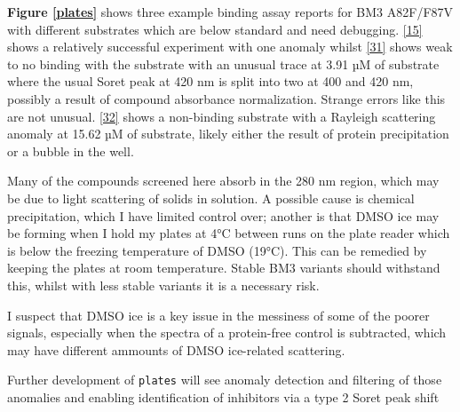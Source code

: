 \documentclass{article}
\begin{document}
\par
\textbf{Figure \ref{plates}} shows three example binding assay reports for BM3 A82F/F87V with different substrates which are below standard and need debugging. \ref{15} shows a relatively successful experiment with one anomaly whilst \ref{31} shows weak to no binding with the substrate with an unusual trace at 3.91 µM of substrate where the usual Soret peak at 420 nm is split into two at 400 and 420 nm, possibly a result of compound absorbance normalization. Strange errors like this are not unusual. \ref{32} shows a non-binding substrate with a Rayleigh scattering anomaly at 15.62 µM of substrate, likely either the result of protein precipitation or a bubble in the well. %
\par
Many of the compounds screened here absorb in the 280 nm region, which may be due to light scattering of solids in solution. A possible cause is chemical precipitation, which I have limited control over; another is that DMSO ice may be forming when I hold my plates at 4°C between runs on the plate reader which is below the freezing temperature of DMSO (19°C). This can be remedied by keeping the plates at room temperature. Stable BM3 variants should withstand this, whilst with less stable variants it is a necessary risk.  %
\par
I suspect that DMSO ice is a key issue in the messiness of some of the poorer signals, especially when the spectra of a protein-free control is subtracted, which may have different ammounts of DMSO ice-related scattering.
\par
Further development of \texttt{plates} will see anomaly detection and filtering of those anomalies and enabling identification of inhibitors via a type 2 Soret peak shift
\end{document}
